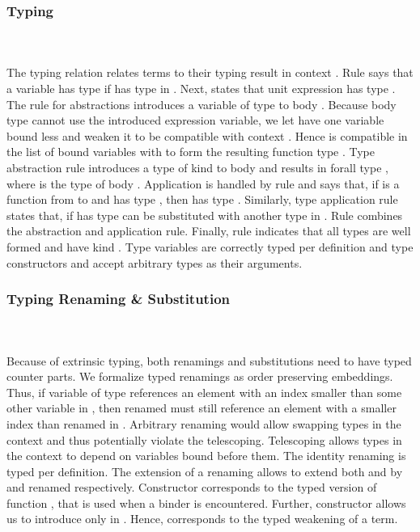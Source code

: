 \subsubsection{Typing}\hfill\\\\
The typing relation    \Data{:}  relates terms  to their typing result  in context .
\FTyping
Rule  says that a variable   has type  if  has type  in . Next,  states that unit expression  has type . 
The rule for abstractions  introduces a variable of type  to body . 
Because body type  cannot use the introduced expression variable, we let  have one variable bound less and weaken it to be compatible with context   . 
Hence  is compatible in the list of bound variables with  to form the resulting function type   . 
Type abstraction rule  introduces a type of kind  to body  and results in forall type  , where  is the type of body . 
Application is handled by rule  and says that, if  is a function from  to  and  has type , then    has type . Similarly, type application rule  states that, if  has type    can be substituted with another type  in . 
Rule  combines the abstraction and application rule.
Finally, rule  indicates that all types  are well formed and have kind . Type variables are correctly typed per definition and type constructors  and  accept arbitrary types as their arguments.

\subsubsection{Typing Renaming \& Substitution}\hfill\\\\
Because of extrinsic typing, both renamings and substitutions need to have typed counter parts. 
We formalize typed renamings as order preserving embeddings. 
Thus, if variable  of type    references an element with an index smaller than some other variable  in , then renamed  must still reference an element with a smaller index than renamed  in .
Arbitrary renaming would allow swapping types in the context and thus potentially violate the telescoping. Telescoping allows types in the context to depend on variables bound before them.
\FRenTyping
The identity renaming  is typed per definition. The extension of a renaming  allows to extend both  and  by  and renamed  respectively. Constructor  corresponds to the typed version of function , that is used when a binder is encountered. Further, constructor  allows us to introduce  only in . Hence,  corresponds to the typed weakening of a term.


